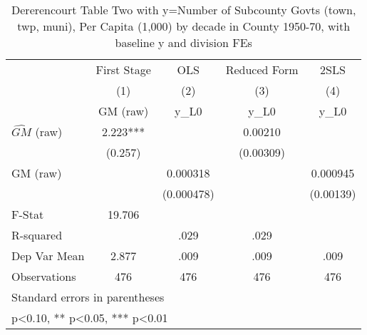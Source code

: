 \begin{table}[htbp]\centering
\def\sym#1{\ifmmode^{#1}\else\(^{#1}\)\fi}
\caption{Dererencourt Table Two with y=Number of Subcounty Govts (town, twp, muni), Per Capita (1,000) by decade in County 1950-70, with baseline y and division FEs}
\begin{tabular}{l*{4}{c}}
\toprule
                    & First Stage   &         OLS   &Reduced Form   &        2SLS   \\
                    &\multicolumn{1}{c}{(1)}&\multicolumn{1}{c}{(2)}&\multicolumn{1}{c}{(3)}&\multicolumn{1}{c}{(4)}\\
                    &\multicolumn{1}{c}{GM  (raw)}&\multicolumn{1}{c}{y\_L0}&\multicolumn{1}{c}{y\_L0}&\multicolumn{1}{c}{y\_L0}\\
\midrule
$\hat{GM}$ (raw)    &       2.223***&               &     0.00210   &               \\
                    &     (0.257)   &               &   (0.00309)   &               \\
\addlinespace
GM  (raw)           &               &    0.000318   &               &    0.000945   \\
                    &               &  (0.000478)   &               &   (0.00139)   \\
\midrule
F-Stat              &      19.706   &               &               &               \\
R-squared           &               &        .029   &        .029   &               \\
Dep Var Mean        &       2.877   &        .009   &        .009   &        .009   \\
Observations        &         476   &         476   &         476   &         476   \\
\bottomrule
\multicolumn{5}{l}{\footnotesize Standard errors in parentheses}\\
\multicolumn{5}{l}{\footnotesize * p<0.10, ** p<0.05, *** p<0.01}\\
\end{tabular}
\end{table}
